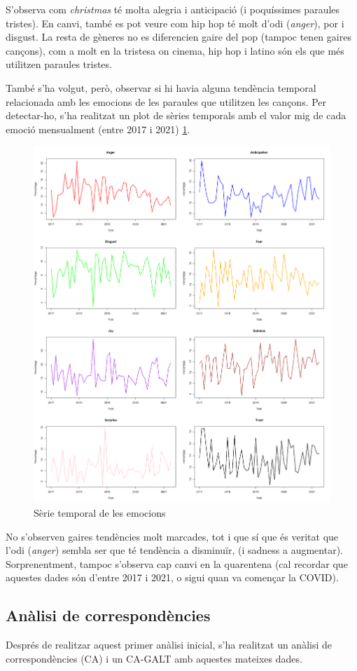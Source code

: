 S'observa com \textit{christmas} té molta alegria i anticipació (i poquíssimes paraules tristes). En canvi, també es pot veure com hip hop té molt d'odi (\textit{anger}), por i disgust. La resta de gèneres no es diferencien gaire del pop (tampoc tenen gaires cançons), com a molt en la tristesa on cinema, hip hop i latino són els que més utilitzen paraules tristes.

També s'ha volgut, però, observar si hi havia alguna tendència temporal relacionada amb les emocions de les paraules que utilitzen les cançons. Per detectar-ho, s'ha realitzat un plot de sèries temporals amb el valor mig de cada emoció mensualment (entre 2017 i 2021) \ref{fig:textual_emotions_time_series}.

\begin{figure}[H]
    \centering
    \includegraphics[width=0.7\linewidth]{Images//8_Textual//Analysis/all_time_series.png}
    \caption{Sèrie temporal de les emocions}
    \label{fig:textual_emotions_time_series}
\end{figure}

No s'observen gaires tendències molt marcades, tot i que sí que és veritat que l'odi (\textit{anger}) sembla ser que té tendència a disminuïr, (i sadness a augmentar). Sorprenentment, tampoc s'observa cap canvi en la quarentena (cal recordar que aquestes dades són d'entre 2017 i 2021, o sigui quan va començar la COVID).

\subsection{Anàlisi de correspondències}
Després de realitzar aquest primer anàlisi inicial, s'ha realitzat un anàlisi de correspondències (CA) i un CA-GALT amb aquestes mateixes dades.

